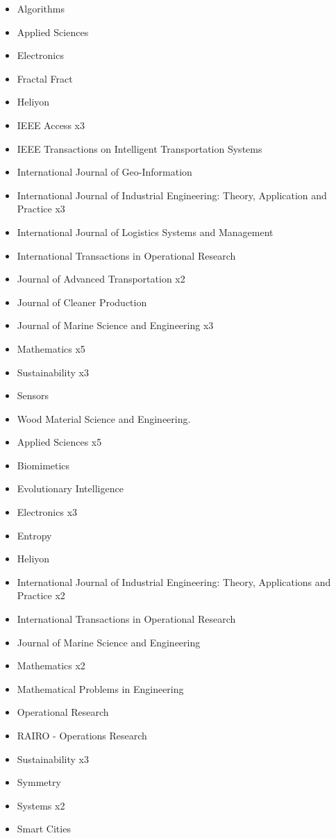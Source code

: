 {\begin{itemize}
\item Algorithms
\item Applied Sciences
\item Electronics
\item Fractal Fract
\item Heliyon
\item IEEE Access x3
\item IEEE Transactions on Intelligent Transportation Systems
\item International Journal of Geo-Information
\item International Journal of Industrial Engineering: Theory, Application and Practice x3
\item International Journal of Logistics Systems and Management
\item International Transactions in Operational Research
\item Journal of Advanced Transportation x2
\item Journal of Cleaner Production
\item Journal of Marine Science and Engineering x3
\item Mathematics x5
\item Sustainability x3
\item Sensors
\item Wood Material Science and Engineering.
\end{itemize}
}

{\begin{itemize}
\item Applied Sciences x5
\item Biomimetics
\item Evolutionary Intelligence
\item Electronics x3
\item Entropy
\item Heliyon
\item International Journal of Industrial Engineering: Theory, Applications and Practice x2
\item International Transactions in Operational Research
\item Journal of Marine Science and Engineering
\item Mathematics x2
\item Mathematical Problems in Engineering
\item Operational Research
\item RAIRO - Operations Research
\item Sustainability x3
\item Symmetry
\item Systems x2
\item Smart Cities
\end{itemize}
}

